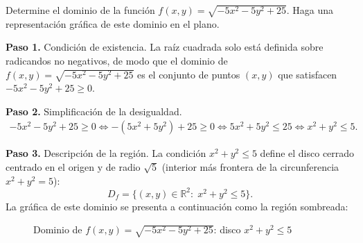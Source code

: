 \begin{prob}
Determine el dominio de la función $f(x,y)=\sqrt{-5x^2-5y^2+25}$. Haga una representación gráfica de este dominio en el plano.
\begin{myproof}
\textbf{Paso 1.} Condición de existencia. La raíz cuadrada solo está definida
sobre radicandos no negativos, de modo que el dominio de
$f(x,y)=\sqrt{-5x^2-5y^2+25}$ es el conjunto de puntos $(x,y)$ que satisfacen
$-5x^2-5y^2+25\geq 0.$

\textbf{Paso 2.} Simplificación de la desigualdad.
\begin{align*}
-5x^2-5y^2+25\geq 0 \Leftrightarrow -(5x^2+5y^2)+25\geq 0 \Leftrightarrow 5x^2+5y^2\leq 25
\Leftrightarrow x^2+y^2\leq 5.
\end{align*}

\textbf{Paso 3.} Descripción de la región. La condición $x^2+y^2\leq 5$ define
el disco cerrado centrado en el origen y de radio $\sqrt{5}$ (interior más
frontera de la circunferencia $x^2+y^2=5$):
\[
  \boxed{D_f=\{(x,y)\in\mathbb{R}^2:\;x^2+y^2\leq 5\}.}
\]
La gráfica de este dominio se presenta a continuación como la región sombreada:
\begin{figure}[H]
\centering
{}
\caption{Dominio de $f(x,y)=\sqrt{-5x^2-5y^2+25}$: disco $x^2+y^2\leq 5$}
\label{fig:dom_circulo_5x2y2}
\end{figure}
\end{myproof}
\end{prob}

